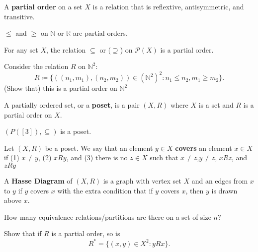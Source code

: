 \begin{definition}
	A \textbf{partial order} on a set \( X \) is a relation that is reflextive, antisymmetric, and transitive.
\end{definition}

\begin{eg}
	\( \le  \) and \( \ge  \) on \( \mathbb{N} \) or \( \mathbb{R} \) are partial orders.
\end{eg}

\begin{eg}
	For any set \( X \), the relation \( \subseteq \) or (\( \supseteq \)) on \( \mathcal{P}(X) \) is a partial order.
\end{eg}

\begin{eg}
	Consider the relation \( R \) on \( \mathbb{N}^2 \): \[
		R \coloneq \{((n_{1},m_{1}),(n_{2},m_{2})) \in (\mathbb{N}^2)^2 \colon n_{1} \le  n_{2}, m_{1} \ge  m_{2}\}
	.\] (Show that) this is a partial order on \( \mathbb{N}^2 \)
\end{eg}

\begin{definition}
	A partially ordered set, or a \textbf{poset}, is a pair \( (X,R) \) where \( X  \) is a set and \( R \) is a partial order on \( X \).
\end{definition}

\begin{eg}
	\( (P([3]),\subseteq) \) is a poset.
\end{eg}

\begin{definition}
	Let \( (X,R) \) be a poset. We say that an element \( y \in X \) \textbf{covers} an element \( x \in X \) if (1) \( x\neq y \), (2) \( xRy \), and (3) there is no \( z \in X \) such that \( x\neq z \),\( y\neq z \), \( xRz \), and \( zRy \)
\end{definition}

\begin{definition}
	A \textbf{Hasse Diagram} of \( (X,R) \) is a graph with vertex set \( X \) and an edges from \( x \) to \( y \) if \( y \) covers \( x \) with the extra condition that if \( y \) covers \( x \), then \( y  \) is drawn above \( x \).
\end{definition}

How many equivalence relations/partitions are there on a set of size \( n \)?

Show that if \( R \) is a partial order, so is \[
	R^* = \{(x,y) \in X^2 \colon yRx \} 
.\] 
